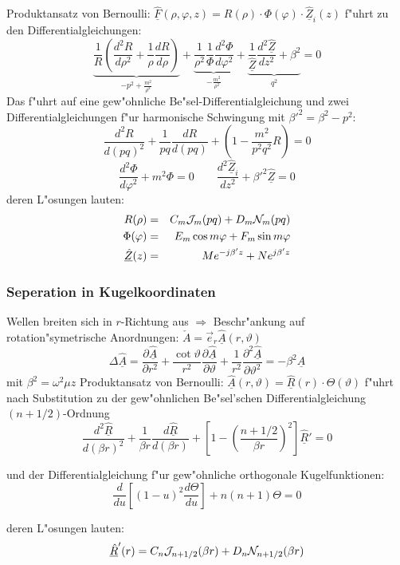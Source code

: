 Produktansatz von Bernoulli:
$\underline{\hat{F}}(\rho,\varphi,z)=R(\rho)\cdot \Phi(\varphi)\cdot
 \underline{\hat{Z}}_i(z)$
f"uhrt zu den Differentialgleichungen:
$$\underbrace{\frac{1}{R}\left(\frac{d^2R}{d\rho^2}+\frac{1}{\rho}
   \frac{dR}{d\rho} \right)}_{-p^2+\frac{m^2}{\rho^2}}+
   \underbrace{\frac{1}{\rho^2}\frac{1}{\Phi}\frac{d^2\Phi}{d\varphi^2}}_{
   -\frac{m^2}{\rho^2}}+\underbrace{\frac{1}{
   \underline{\hat{Z}}}\frac{d^2\underline{\hat{Z}}}{dz^2}+\beta^2}_{q^2}=0$$
Das f"uhrt auf eine gew"ohnliche Be"sel-Differentialgleichung und zwei
Differentialgleichungen f"ur harmonische Schwingung mit $\beta'^2=\beta^2-p^2$:
$$\frac{d^2R}{d(pq)^2}+\frac{1}{pq}\frac{dR}{d(pq)}+\left(1-\frac{m^2}{p^2q^2}R
   \right)=0$$
$$\frac{d^2\Phi}{d\varphi^2}+m^2\Phi=0 \qquad
  \frac{d^2\underline{\hat{Z}}_i}{dz^2}+\beta'^2\underline{\hat{Z}}=0$$
deren L"osungen lauten:
\begin{eqnarray*}
R(\rho)&=&C_m{\cal J}_m(pq)+D_m{\cal N}_m(pq)\\\Phi(\varphi)&=&E_m\cos
m\varphi+F_m\sin m\varphi\\ \underline{\hat{Z}}
(z)&=&M e^{-j\beta'z}+N e^{j\beta ' z}
\end{eqnarray*}

\subsubsection{Seperation in Kugelkoordinaten}
Wellen breiten sich in $r$-Richtung aus $\Rightarrow$ Beschr"ankung auf
rotation"symetrische Anordnungen:
$\check{A}=\vec{e}_r\underline{\hat{A}}(r,\vartheta)$
$$\Delta\underline{\hat{A}}=\frac{\partial\underline{\hat{A}}}{\partial r^2}+
\frac{\cot\vartheta}{r^2}
\frac{\partial\underline{\hat{A}}}{\partial\vartheta}+\frac{1}{r^2}
\frac{\partial^2\underline{\hat{A}}}{\partial\vartheta^2}=-\beta^2
\underline{\hat{A}}$$
mit $\beta^2=\omega^2\mu z$
Produktansatz von Bernoulli:
$\underline{\hat{A}}(r,\vartheta)=\underline{\hat{R}}(r)\cdot\Theta(\vartheta)$
f"uhrt nach Substitution zu der gew"ohnlichen Be"sel'schen Differentialgleichung
$(n+1/2)$-Ordnung
$$\frac{d^2\underline{\hat{R}}}{d(\beta r)^2}+\frac{1}{\beta r}
   \frac{d\underline{\hat{R}}}{d(\beta r)}+\left[1-\left(\frac{n+1/2}{\beta r}
   \right)^2\right]\underline{\hat{R}}'=0$$

und der Differentialgleichung f"ur gew"ohnliche orthogonale Kugelfunktionen:
$$\frac{d}{du}\left[(1-u)^2\frac{d\Theta}{du}\right]+n(n+1)\Theta=0$$

deren L"osungen lauten:
$$\underline{\hat{R}}'(r)=C_n{\cal J}_{n+1/2}(\beta r)+D_n
   {\cal N}_{n+1/2}(\beta r)$$

